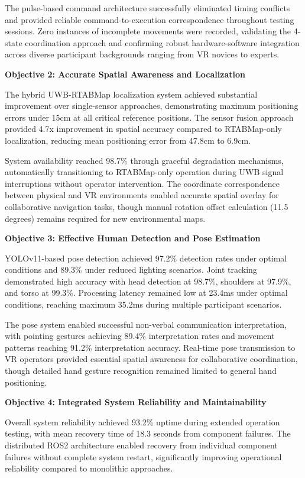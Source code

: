 The pulse-based command architecture successfully eliminated timing conflicts and provided reliable command-to-execution correspondence throughout testing sessions. Zero instances of incomplete movements were recorded, validating the 4-state coordination approach and confirming robust hardware-software integration across diverse participant backgrounds ranging from VR novices to experts.

\textbf{Objective 2: Accurate Spatial Awareness and Localization}

The hybrid UWB-RTABMap localization system achieved substantial improvement over single-sensor approaches, demonstrating maximum positioning errors under 15cm at all critical reference positions. The sensor fusion approach provided 4.7x improvement in spatial accuracy compared to RTABMap-only localization, reducing mean positioning error from 47.8cm to 6.9cm.

System availability reached 98.7\% through graceful degradation mechanisms, automatically transitioning to RTABMap-only operation during UWB signal interruptions without operator intervention. The coordinate correspondence between physical and VR environments enabled accurate spatial overlay for collaborative navigation tasks, though manual rotation offset calculation (11.5 degrees) remains required for new environmental maps.

\textbf{Objective 3: Effective Human Detection and Pose Estimation}

YOLOv11-based pose detection achieved 97.2\% detection rates under optimal conditions and 89.3\% under reduced lighting scenarios. Joint tracking demonstrated high accuracy with head detection at 98.7\%, shoulders at 97.9\%, and torso at 99.3\%. Processing latency remained low at 23.4ms under optimal conditions, reaching maximum 35.2ms during multiple participant scenarios.

The pose system enabled successful non-verbal communication interpretation, with pointing gestures achieving 89.4\% interpretation rates and movement patterns reaching 91.2\% interpretation accuracy. Real-time pose transmission to VR operators provided essential spatial awareness for collaborative coordination, though detailed hand gesture recognition remained limited to general hand positioning.

\textbf{Objective 4: Integrated System Reliability and Maintainability}

Overall system reliability achieved 93.2\% uptime during extended operation testing, with mean recovery time of 18.3 seconds from component failures. The distributed ROS2 architecture enabled recovery from individual component failures without complete system restart, significantly improving operational reliability compared to monolithic approaches.

